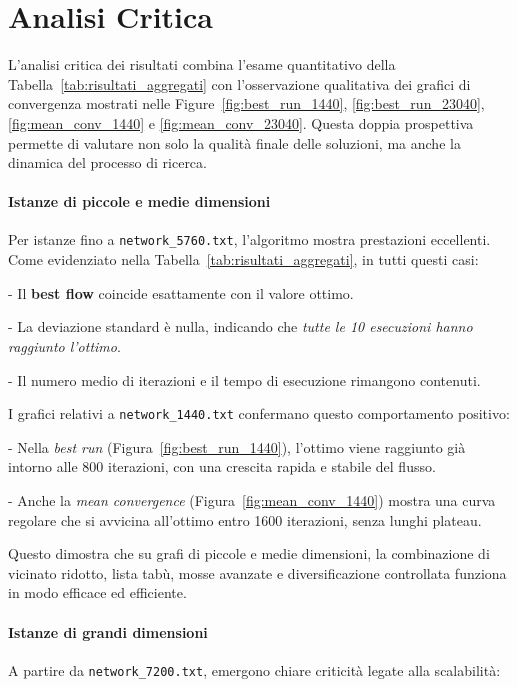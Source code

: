 \documentclass[12pt,a4paper]{article}
\begin{document}
\section{Analisi Critica}

L’analisi critica dei risultati combina l’esame quantitativo della Tabella~\ref{tab:risultati_aggregati} con l’osservazione qualitativa dei grafici di convergenza mostrati nelle Figure~\ref{fig:best_run_1440}, \ref{fig:best_run_23040}, \ref{fig:mean_conv_1440} e \ref{fig:mean_conv_23040}. Questa doppia prospettiva permette di valutare non solo la qualità finale delle soluzioni, ma anche la dinamica del processo di ricerca.

\paragraph{Istanze di piccole e medie dimensioni}

Per istanze fino a \texttt{network\_5760.txt}, l’algoritmo mostra prestazioni eccellenti. Come evidenziato nella Tabella~\ref{tab:risultati_aggregati}, in tutti questi casi:

    
- Il \textbf{best flow} coincide esattamente con il valore ottimo.
    
- La deviazione standard è nulla, indicando che \textit{tutte le 10 esecuzioni hanno raggiunto l’ottimo}.
    
- Il numero medio di iterazioni e il tempo di esecuzione rimangono contenuti.


I grafici relativi a \texttt{network\_1440.txt} confermano questo comportamento positivo:

    
- Nella \textit{best run} (Figura~\ref{fig:best_run_1440}), l’ottimo viene raggiunto già intorno alle 800 iterazioni, con una crescita rapida e stabile del flusso.
    
- Anche la \textit{mean convergence} (Figura~\ref{fig:mean_conv_1440}) mostra una curva regolare che si avvicina all’ottimo entro 1600 iterazioni, senza lunghi plateau.


Questo dimostra che su grafi di piccole e medie dimensioni, la combinazione di vicinato ridotto, lista tabù, mosse avanzate e diversificazione controllata funziona in modo efficace ed efficiente.

\paragraph{Istanze di grandi dimensioni}

A partire da \texttt{network\_7200.txt}, emergono chiare criticità legate alla scalabilità:
\end{document}
